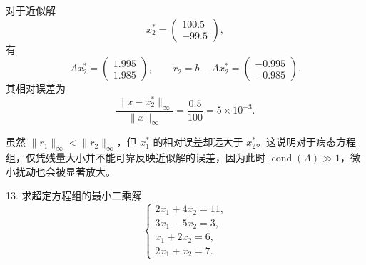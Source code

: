 \documentclass[11pt, a4paper]{ctexart}
\begin{document}
\begin{solution}
    对于近似解
    \[
        x_2^* =
        \begin{pmatrix}
            100.5 \\
            -99.5
        \end{pmatrix},
    \]
    有
    \[
        Ax_2^*
        =
        \begin{pmatrix}
            1.995 \\
            1.985
        \end{pmatrix},
        \qquad
        r_2 = b - Ax_2^*
        =
        \begin{pmatrix}
            -0.995 \\
            -0.985
        \end{pmatrix}.
    \]
    其相对误差为
    \[
        \frac{\|x - x_2^*\|_{\infty}}{\|x\|_{\infty}}
        =
        \frac{0.5}{100}
        = 5 \times 10^{-3}.
    \]

    虽然 $\|r_1\|_{\infty} < \|r_2\|_{\infty}$，但 $x_1^*$ 的相对误差却远大于 $x_2^*$。这说明对于病态方程组，仅凭残量大小并不能可靠反映近似解的误差，因为此时 $\operatorname{cond}(A) \gg 1$，微小扰动也会被显著放大。
\end{solution}


\begin{problem}{13. 求超定方程组的最小二乘解}
    \[
        \begin{cases}
            2x_1 + 4x_2 = 11, \\
            3x_1 - 5x_2 = 3, \\
            x_1 + 2x_2 = 6, \\
            2x_1 + x_2 = 7.
        \end{cases}
    \]
\end{problem}
\end{document}
